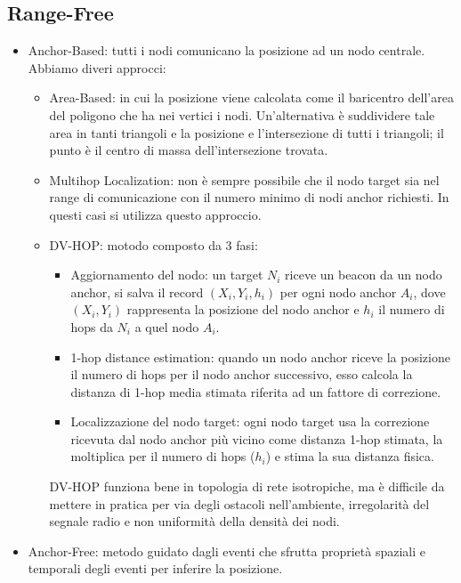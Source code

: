         \newpage

        \subsection{Range-Free}\label{subsubsec3.4.2}
        \begin{itemize}
                \item Anchor-Based: tutti i nodi comunicano la posizione ad un
nodo centrale. Abbiamo diveri approcci:
                \begin{itemize}
                        \item Area-Based: in cui la posizione viene calcolata
come il baricentro dell'area del poligono che ha nei vertici i nodi.
Un'alternativa è suddividere tale area in tanti triangoli e la posizione e
l'intersezione di tutti i triangoli; il punto è il centro di massa
dell'intersezione trovata.
                        \item Multihop Localization: non è sempre possibile che
il nodo target sia nel range di comunicazione con il numero minimo di nodi
anchor richiesti. In questi casi si utilizza questo approccio.
                        \item DV-HOP: motodo composto da 3 fasi:
                        \begin{itemize}
                                \item Aggiornamento del nodo: un target $N_i$
riceve un beacon da un nodo anchor, si salva il record $(X_i, Y_i, h_i)$ per
ogni nodo anchor $A_i$, dove $(X_i, Y_i)$ rappresenta la posizione del nodo
anchor e $h_i$ il numero di hops da $N_i$ a quel nodo $A_i$.
                                \item 1-hop distance estimation: quando un nodo
anchor riceve la posizione il numero di hops per il nodo anchor successivo, esso
calcola la distanza di 1-hop media stimata riferita ad un fattore di correzione.
                                \item Localizzazione del nodo target: ogni nodo
target usa la correzione ricevuta dal nodo anchor più vicino come distanza 1-hop
stimata, la moltiplica per il numero di hops ($h_i$) e stima la sua distanza
fisica.
                        \end{itemize}
                        DV-HOP funziona bene in topologia di rete isotropiche,
ma è difficile da mettere in pratica per via degli ostacoli nell'ambiente,
irregolarità del segnale radio e non uniformità della densità dei nodi.
                \end{itemize}
                \item Anchor-Free: metodo guidato dagli eventi che sfrutta
proprietà spaziali e temporali degli eventi per inferire la posizione.
        \end{itemize}

